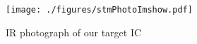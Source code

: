 
\begin{figure}[h]
	\texttt{[image: ./figures/stmPhotoImshow.pdf]}
	\caption{IR photograph of our target IC}
	\label{stm_ir_photo}
\end{figure}
